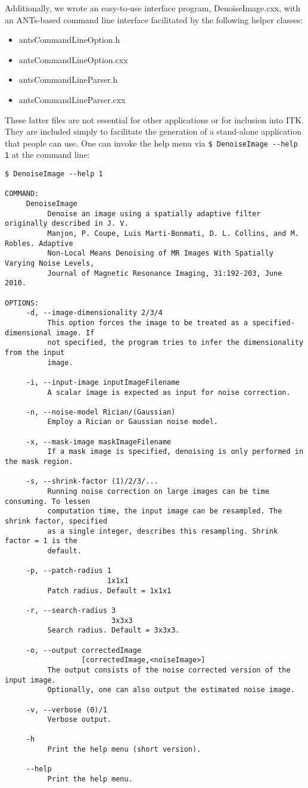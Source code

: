 \documentclass{InsightArticle}
\begin{document}
Additionally, we wrote an easy-to-use interface program, DenoiseImage.cxx, with an ANTs-based command
line interface facilitated by the following helper classes:
\begin{itemize}
  \item antsCommandLineOption.h
  \item antsCommandLineOption.cxx
  \item antsCommandLineParser.h
  \item antsCommandLineParser.cxx
\end{itemize}
These latter files are not essential for other applications or for inclusion into ITK.
They are included simply to facilitate the generation of a stand-alone application that
people can use.  One can invoke the help menu via \verb#$ DenoiseImage --help 1# at the
command line:
\small
\begin{verbatim}
$ DenoiseImage --help 1

COMMAND:
     DenoiseImage
          Denoise an image using a spatially adaptive filter originally described in J. V.
          Manjon, P. Coupe, Luis Marti-Bonmati, D. L. Collins, and M. Robles. Adaptive
          Non-Local Means Denoising of MR Images With Spatially Varying Noise Levels,
          Journal of Magnetic Resonance Imaging, 31:192-203, June 2010.

OPTIONS:
     -d, --image-dimensionality 2/3/4
          This option forces the image to be treated as a specified-dimensional image. If
          not specified, the program tries to infer the dimensionality from the input
          image.

     -i, --input-image inputImageFilename
          A scalar image is expected as input for noise correction.

     -n, --noise-model Rician/(Gaussian)
          Employ a Rician or Gaussian noise model.

     -x, --mask-image maskImageFilename
          If a mask image is specified, denoising is only performed in the mask region.

     -s, --shrink-factor (1)/2/3/...
          Running noise correction on large images can be time consuming. To lessen
          computation time, the input image can be resampled. The shrink factor, specified
          as a single integer, describes this resampling. Shrink factor = 1 is the
          default.

     -p, --patch-radius 1
                        1x1x1
          Patch radius. Default = 1x1x1

     -r, --search-radius 3
                         3x3x3
          Search radius. Default = 3x3x3.

     -o, --output correctedImage
                  [correctedImage,<noiseImage>]
          The output consists of the noise corrected version of the input image.
          Optionally, one can also output the estimated noise image.

     -v, --verbose (0)/1
          Verbose output.

     -h
          Print the help menu (short version).

     --help
          Print the help menu.
\end{verbatim}
\end{document}

